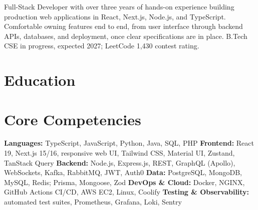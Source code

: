\documentclass[11pt,a4paper,sans]{moderncv}
\begin{document}
\makecvtitle


\vspace{4pt}
\small{Full-Stack Developer with over three years of hands-on experience building production web applications in React, Next.js, Node.js, and TypeScript. Comfortable owning features end to end, from user interface through backend APIs, databases, and deployment, once clear specifications are in place. B.Tech CSE in progress, expected 2027; LeetCode 1,430 contest rating.}


\section{Education}
\vspace{1pt}


\section{Core Competencies}
\vspace{1pt}
\raggedright
\textbf{Languages:} TypeScript, JavaScript, Python, Java, SQL, PHP \textbar{}
\textbf{Frontend:} React 19, Next.js 15/16, responsive web UI, Tailwind CSS, Material UI, Zustand, TanStack Query \textbar{}
\textbf{Backend:} Node.js, Express.js, REST, GraphQL (Apollo), WebSockets, Kafka, RabbitMQ, JWT, Auth0 \textbar{}
\textbf{Data:} PostgreSQL, MongoDB, MySQL, Redis; Prisma, Mongoose, Zod \textbar{}
\textbf{DevOps \& Cloud:} Docker, NGINX, GitHub Actions CI/CD, AWS EC2, Linux, Coolify \textbar{}
\textbf{Testing \& Observability:} automated test suites, Prometheus, Grafana, Loki, Sentry
\par\normalfont
\end{document}
